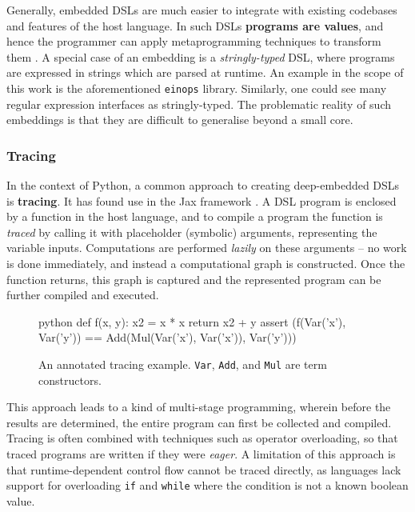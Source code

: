 Generally, embedded DSLs are much easier to integrate with existing codebases and features of the host language.
In such DSLs \textbf{programs are values}, and hence the programmer can apply metaprogramming techniques to transform them \cite{atkey2009unembedding}. 
A special case of an embedding is a \textit{stringly-typed} DSL, where programs are expressed in strings which are parsed at runtime. An example in the scope of this work is the aforementioned \texttt{einops} library.  Similarly, one could see many regular expression interfaces as stringly-typed. The problematic reality of such embeddings is that they are difficult to generalise beyond a small core.

\subsubsection{Tracing} \label{tracing}

In the context of Python, a common approach to creating deep-embedded DSLs is \textbf{tracing}. It has found use in the Jax framework \cite{frostig2018compiling}. A DSL program is enclosed by a function in the host language, and to compile a program the function is \textit{traced} by calling it with placeholder (symbolic) arguments, representing the variable inputs. Computations are performed \textit{lazily} on these arguments -- no work is done immediately, and instead a computational graph is constructed. Once the function returns, this graph is captured and the represented program can be further compiled and executed.

\begin{figure}[ht]
    \centering
    \begin{cminted}{python}
def f(x, y):
    x2 = x * x
    return x2 + y
assert (f(Var('x'), Var('y')) 
        == Add(Mul(Var('x'), Var('x')), Var('y')))
    \end{cminted}
    \caption{An annotated tracing example. \texttt{Var}, \texttt{Add}, and \texttt{Mul} are term constructors.}
    \label{fig:tracing}
\end{figure}

This approach leads to a kind of multi-stage programming, wherein before the results are determined, the entire program can first be collected and compiled. Tracing is often combined with techniques such as operator overloading, so that traced programs are written if they were \textit{eager}. A limitation of this approach is that runtime-dependent control flow cannot be traced directly, as languages lack support for overloading \texttt{if} and \texttt{while} where the condition is not a known boolean value.

